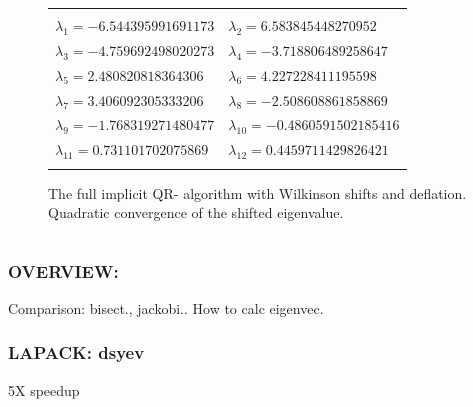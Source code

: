 \documentclass[a4paper,8pt]{beamer} %
\begin{document}
\begin{frame}
\begin{columns}
\begin{figure}
\begin{center}
	\begin{scriptsize}
	\begin{tabular}{ll}
		\hline
		\hline
		\\
		$\lambda_1=
		-6.544395991691173
		$ & $\lambda_2=
		6.583845448270952
		$ \\ $\lambda_3=
		-4.759692498020273
		$ & $\lambda_4=
		-3.718806489258647
		$ \\ $\lambda_5=
		2.480820818364306
		$ & $\lambda_6=
		4.227228411195598
		$ \\ $\lambda_7=
		3.406092305333206
		$ & $\lambda_8=
		-2.508608861858869
		$ \\ $\lambda_9=
		-1.768319271480477
		$ & $\lambda_{10}=
		-0.4860591502185416
		$ \\ $\lambda_{11}=
		0.731101702075869
		$ & $\lambda_{12}=
		0.4459711429826421
		$ \\
		\\
		\hline
		\hline
	\end{tabular}
	\end{scriptsize}
\caption{
	The full implicit QR- algorithm with Wilkinson shifts and deflation. Quadratic convergence
	of the shifted eigenvalue. 
}
\end{center}
\end{figure}
%
%
%
\end{columns}
\end{frame}

\begin{frame} \frametitle{OVERVIEW:}
Comparison: bisect., jackobi.. How to calc eigenvec.
\end{frame}

\begin{frame}
\frametitle{LAPACK: dsyev}
\begin{center}
	5X speedup
\end{center}
\end{frame}
\end{document}
